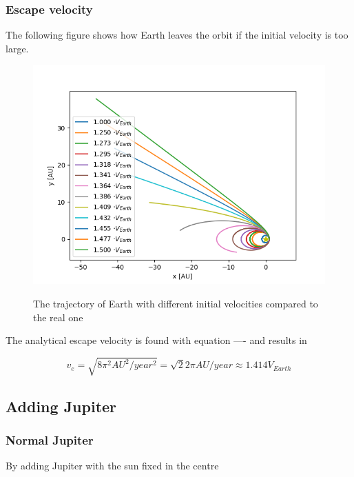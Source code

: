 \documentclass[10pt]{article}
\begin{document}
\begin{multicols}{2}
\subsubsection{Escape velocity}
The following figure
shows how Earth leaves the orbit if the initial velocity is too large.
\begin{figure}[H]
    \centering
    \includegraphics[width=1.0\linewidth]{../results/Esacpe_vel.png}
    \label{fig:name}
    \caption{The trajectory of Earth with different initial velocities compared to the real one}
\end{figure}

The analytical escape velocity is found with equation ---- and results in

\begin{equation}
    v_{e} = \sqrt{8\pi^2 AU^2/year^2} = \sqrt{2}2\pi AU/year \approx 1.414V_{Earth}\nonumber
\end{equation}


\subsection{Adding Jupiter}
\subsubsection{Normal Jupiter}
By adding Jupiter with the sun fixed in the centre 

\end{multicols}
\end{document}
